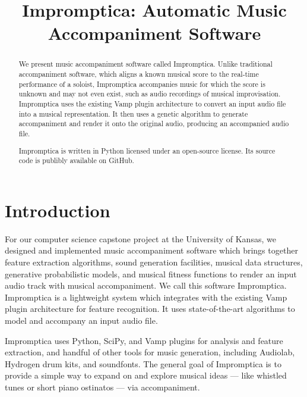 \documentclass[11pt,conference,letterpaper]{IEEEtran}
\begin{document}
\title{Impromptica: Automatic Music Accompaniment Software}
\author{}

\maketitle

\begin{abstract}
We present music accompaniment software called Impromptica. Unlike traditional accompaniment software, which aligns a known musical score to the real-time performance of a soloist, Impromptica accompanies music for which the score is unknown and may not even exist, such as audio recordings of musical improvisation. Impromptica uses the existing Vamp plugin architecture to convert an input audio file into a musical representation. It then uses a genetic algorithm to generate accompaniment and render it onto the original audio, producing an accompanied audio file.

Impromptica is written in Python licensed under an open-source license. Its source code is publibly available on GitHub.


\end{abstract}

\section{Introduction}

For our computer science capstone project at the University of Kansas, we designed and implemented music accompaniment software which brings together feature extraction algorithms, sound generation facilities, musical data structures, generative probabilistic models, and musical fitness functions to render an input audio track with musical accompaniment. We call this software Impromptica. Impromptica is a lightweight system which integrates with the existing Vamp plugin architecture for feature recognition. It uses state-of-the-art algorithms to model and accompany an input audio file.

Impromptica uses Python, SciPy, and Vamp plugins for analysis and feature extraction, and handful of other tools for music generation, including Audiolab, Hydrogen drum kits, and soundfonts. The general goal of Impromptica is to provide a simple way to expand on and explore musical ideas --- like whistled tunes or short piano ostinatos --- via accompaniment.
\end{document}
